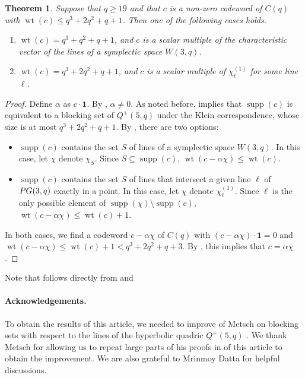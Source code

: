 \documentclass[a4paper]{article}
\newtheorem{thm}{Theorem}[section]
\theoremstyle{definition}
\newcommand{\pg}{\textnormal{PG}}
\newcommand{\one}{\mathbf 1}
\newcommand{\mq}{%
 Q}
\DeclareMathOperator{\supp}{supp}
\DeclareMathOperator{\wt}{wt}
\begin{document}
\begin{thm}
 \label{Thm:LargeCode}
 Suppose that $q \geq 19$ and that $c$ is a non-zero codeword of $C(q)$ with $\wt(c) \leq q^3 + 2q^2 + q + 1$.
 Then one of the following cases holds.
 \begin{enumerate}
  \item $\wt(c) = q^3 + q^2 + q + 1$, and $c$ is a scalar multiple of the characteristic vector of the lines of a symplectic space $W(3,q)$.
  \item $\wt(c) = q^3 + 2q^2 + q + 1$, and $c$ is a scalar multiple of $\chi^{(1)}_\ell$ for some line $\ell$.
 \end{enumerate}
\end{thm}

\begin{proof}
 Define $\alpha$ as $c \cdot \one$.
 By , $\alpha \neq 0$.
 As noted before,  implies that $\supp(c)$ is equivalent to a blocking set of $Q^+(5,q)$ under the Klein correspondence, whose size is at most $q^3 + 2q^2 + q + 1$.
 By , there are two options:
 \begin{itemize}
  \item $\supp(c)$ contains the set $S$ of lines of a symplectic space $W(3,q)$.
  In this case, let $\chi$ denote $\chi_S$.
  Since $S \subseteq \supp(c)$, $\wt(c - \alpha \chi) \leq \wt(c)$.
  \item $\supp(c)$ contains the set $S$ of lines that intersect a given line $\ell$ of $\pg(3,q)$ exactly in a point.
  In this case, let $\chi$ denote $\chi^{(1)}_\ell$.
  Since $\ell$ is the only possible element of $\supp(\chi) \setminus \supp(c)$, $\wt(c - \alpha \chi) \leq \wt(c)+1$.
 \end{itemize}
 In both cases, we find a codeword $c - \alpha \chi$ of $C(q)$ with $(c-\alpha \chi) \cdot \one = 0$ and $\wt(c - \alpha \chi) \leq \wt(c) + 1 < q^3 + 2q^2 + q + 3$.
 By , this implies that $c = \alpha \chi$.
\end{proof}

Note that  follows directly from  and 

\paragraph{Acknowledgements.}
To obtain the results of this article, we needed to improve  of Metsch on blocking sets with respect to the lines of the hyperbolic quadric $\mq^+(5,q)$ \cite{metsch2000blocking}. We thank Metsch for allowing us to repeat large parts of his proofs in  of this article to obtain the improvement.
We are also grateful to Mrinmoy Datta for helpful discussions.
\end{document}
